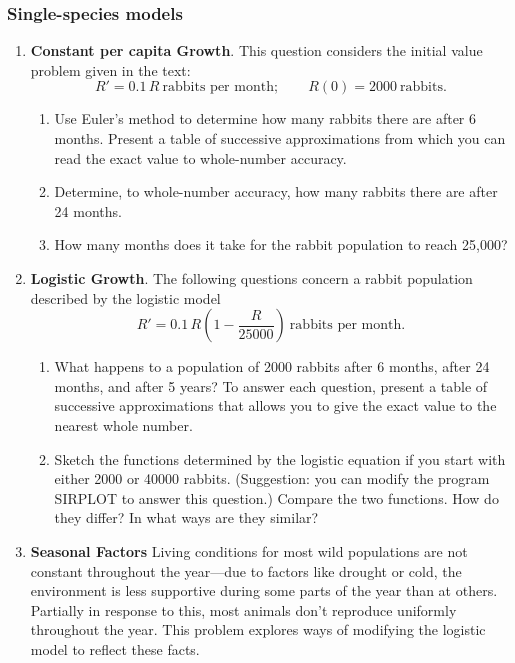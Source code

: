 \subsubsection{Single-species models}
\label{subsubsec:single-species-models}



\begin{enumerate}
\item {\bf Constant per capita Growth}.  This question considers the initial value problem given in the text:
	\[
R' = 0.1\,R \ \mbox{rabbits per month}; \qquad
		R(0) = 2000 \ \mbox{rabbits}.
\]


  \begin{enumerate}
  \item Use Euler's method to determine how many rabbits there are after 6 months.  Present a table of successive approximations from which you can read the exact value to whole-number accuracy.

  \item Determine, to whole-number accuracy, how many rabbits there are after 24 months.

  \item How many months does it take for the rabbit population to reach 25,000?


\end{enumerate}
\item {\bf Logistic Growth}.  The following questions concern  a rabbit population described by the logistic model
	\[
R' = 0.1\,R \left( 1 - \dfrac{R}{25000} \right) 
		\ \mbox{rabbits per month}.
\]


  \begin{enumerate}
  \item What happens to a population of 2000 rabbits after 6 months, after 24 months, and after 5 years?   To answer each question, present a table of successive approximations that allows you to give the exact value to the nearest whole number.

  \item Sketch the functions determined by the logistic equation if you start with either 2000 or 40000 rabbits.  (Suggestion: you can modify the program SIRPLOT to answer this question.)  Compare the two functions.  How do they differ?  In what ways are they similar?


\end{enumerate}
\item {\bf Seasonal Factors} Living conditions for most wild
populations are not constant throughout the year---due to factors like
drought or cold, the environment is less supportive during some parts
of the year than at others.  Partially in response to this, most
animals don't reproduce uniformly throughout the year.  This problem
explores ways of modifying the logistic model to reflect these facts.


\end{enumerate}

